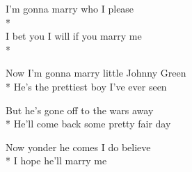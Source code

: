 

\versemark
I’m gonna marry who I please\\*
\vin{}\\
I bet you I will if you marry me\\*
\vin{}

\versemark
Now I’m gonna marry little Johnny Green\etc\\*
He’s the prettiest boy I’ve ever seen\etcrefrain

\versemark
But he’s gone off to the wars away\etc\\*
He’ll come back some pretty fair day\etcrefrain

\versemark
Now yonder he comes I do believe\etc\\*
I hope he’ll marry me\etcrefrain

